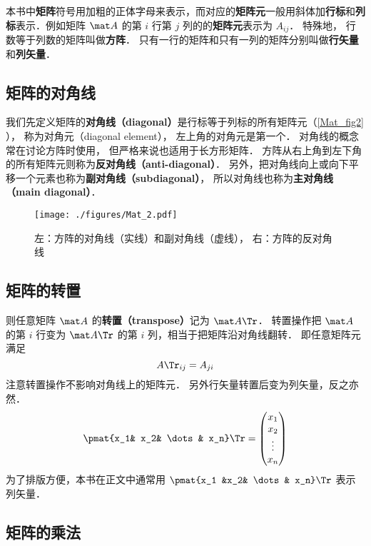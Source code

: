 
本书中\textbf{矩阵}符号用加粗的正体字母来表示，而对应的\textbf{矩阵元}一般用斜体加\textbf{行标}和\textbf{列标}表示．例如矩阵 $\mat A$ 的第 $i$ 行第 $j$ 列的的\textbf{矩阵元}表示为 $A_{ij}$． 特殊地， 行数等于列数的矩阵叫做\textbf{方阵}． 只有一行的矩阵和只有一列的矩阵分别叫做\textbf{行矢量}和\textbf{列矢量}．

\subsection{矩阵的对角线}
我们先定义矩阵的\textbf{对角线（diagonal）}是行标等于列标的所有矩阵元（\autoref{Mat_fig2} ）， 称为对角元（diagonal element）， 左上角的对角元是第一个． 对角线的概念常在讨论方阵时使用， 但严格来说也适用于长方形矩阵． 方阵从右上角到左下角的所有矩阵元则称为\textbf{反对角线（anti-diagonal）}． 另外，把对角线向上或向下平移一个元素也称为\textbf{副对角线（subdiagonal）}， 所以对角线也称为\textbf{主对角线（main diagonal）}．

\begin{figure}[ht]
\centering
\texttt{[image: ./figures/Mat\_2.pdf]}
\caption{左：方阵的对角线（实线）和副对角线（虚线）， 右：方阵的反对角线} \label{Mat_fig2}
\end{figure}

\subsection{矩阵的转置}\label{Mat_sub1}
则任意矩阵 $\mat A$ 的\textbf{转置（transpose）}记为 $\mat A\Tr$． 转置操作把 $\mat A$ 的第 $i$ 行变为 $\mat A\Tr$ 的第 $i$ 列，相当于把矩阵沿对角线翻转． 即任意矩阵元满足
\begin{equation}\label{Mat_eq3}
A\Tr_{ij} = A_{ji}
\end{equation}
注意转置操作不影响对角线上的矩阵元． 另外行矢量转置后变为列矢量，反之亦然．
\begin{equation}\label{Mat_eq2}
\pmat{x_1& x_2& \dots& x_n}\Tr = \begin{pmatrix} x_1\\x_2\\ \vdots\\x_n \end{pmatrix}
\end{equation}
为了排版方便，本书在正文中通常用 $\pmat{x_1 &x_2& \dots& x_n}\Tr$ 表示列矢量．

\subsection{矩阵的乘法}

